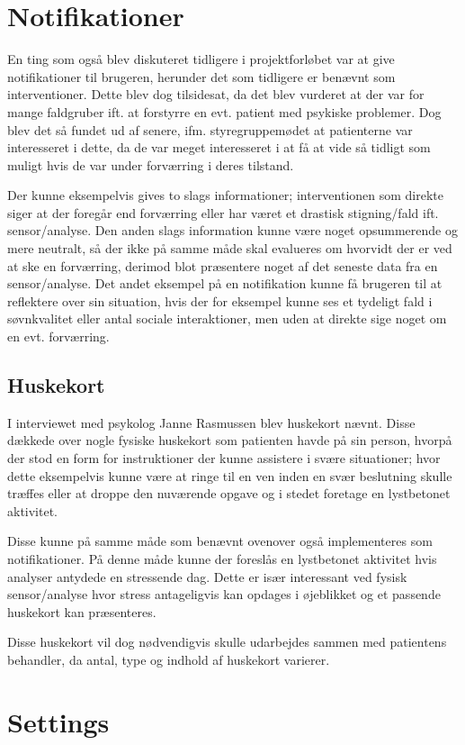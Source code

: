 \section{Notifikationer}
En ting som også blev diskuteret tidligere i projektforløbet var at give notifikationer til brugeren, herunder det som tidligere er benævnt som interventioner.
Dette blev dog tilsidesat, da det blev vurderet at der var for mange faldgruber ift. at forstyrre en evt. patient med psykiske problemer.
Dog blev det så fundet ud af senere, ifm. styregruppemødet at patienterne var interesseret i dette, da de var meget interesseret i at få at vide så tidligt som muligt hvis de var under forværring i deres tilstand.

Der kunne eksempelvis gives to slags informationer; interventionen som direkte siger at der foregår end forværring eller har været et drastisk stigning/fald ift. sensor/analyse.
Den anden slags information kunne være noget opsummerende og mere neutralt, så der ikke på samme måde skal evalueres om hvorvidt der er ved at ske en forværring, derimod blot præsentere noget af det seneste data fra en sensor/analyse.
Det andet eksempel på en notifikation kunne få brugeren til at reflektere over sin situation, hvis der for eksempel kunne ses et tydeligt fald i søvnkvalitet eller antal sociale interaktioner, men uden at direkte sige noget om en evt. forværring.

\subsection{Huskekort}
I interviewet med psykolog Janne Rasmussen blev huskekort nævnt.
Disse dækkede over nogle fysiske huskekort som patienten havde på sin person, hvorpå der stod en form for instruktioner der kunne assistere i svære situationer; hvor dette eksempelvis kunne være at ringe til en ven inden en svær beslutning skulle træffes eller at droppe den nuværende opgave og i stedet foretage en lystbetonet aktivitet.

Disse kunne på samme måde som benævnt ovenover også implementeres som notifikationer.
På denne måde kunne der foreslås en lystbetonet aktivitet hvis analyser antydede en stressende dag.
Dette er især interessant ved fysisk sensor/analyse hvor stress antageligvis kan opdages i øjeblikket og et passende huskekort kan præsenteres.

Disse huskekort vil dog nødvendigvis skulle udarbejdes sammen med patientens behandler, da antal, type og indhold af huskekort varierer.

\section{Settings}
